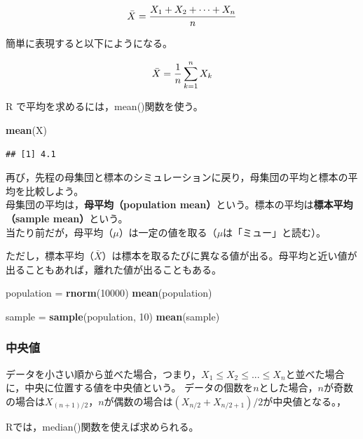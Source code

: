 \documentclass[]{article}
\newenvironment{Shaded}{\begin{snugshade}}{\end{snugshade}}
\newcommand{\KeywordTok}[1]{\textcolor[rgb]{0.13,0.29,0.53}{\textbf{#1}}}
\newcommand{\DecValTok}[1]{\textcolor[rgb]{0.00,0.00,0.81}{#1}}
\newcommand{\StringTok}[1]{\textcolor[rgb]{0.31,0.60,0.02}{#1}}
\newcommand{\NormalTok}[1]{#1}
\begin{document}
\[
\bar{X} = \frac{X_{1} + X_{2} + \cdots + X_{n} }{n}\\  
\]

簡単に表現すると以下にようになる。

\[
\bar{X} = \frac{1}{n}\sum_{k=1}^{n}X_{k}\\  
\]

R で平均を求めるには，mean()関数を使う。

\begin{Shaded}
\begin{Highlighting}[]
\KeywordTok{mean}\NormalTok{(X)}
\end{Highlighting}
\end{Shaded}

\begin{verbatim}
## [1] 4.1
\end{verbatim}

再び，先程の母集団と標本のシミュレーションに戻り，母集団の平均と標本の平均を比較しよう。\\
母集団の平均は，\textbf{母平均（population
mean）}という。標本の平均は\textbf{標本平均（sample mean）}という。\\
当たり前だが，母平均（\(\mu\)）は一定の値を取る（\(\mu\)は「ミュー」と読む）。

ただし，標本平均（\(\bar{X}\)）は標本を取るたびに異なる値が出る。母平均と近い値が出ることもあれば，離れた値が出ることもある。

\begin{Shaded}
\begin{Highlighting}[]
\NormalTok{population =}\StringTok{ }\KeywordTok{rnorm}\NormalTok{(}\DecValTok{10000}\NormalTok{)}
\KeywordTok{mean}\NormalTok{(population)}

\NormalTok{sample =}\StringTok{ }\KeywordTok{sample}\NormalTok{(population, }\DecValTok{10}\NormalTok{)}
\KeywordTok{mean}\NormalTok{(sample)}
\end{Highlighting}
\end{Shaded}

\subsubsection{中央値}

データを小さい順から並べた場合，つまり，\(X_{1} \le X_{2} \le ... \le X_{n}\)と並べた場合に，中央に位置する値を中央値という。
データの個数を\(n\)とした場合，\(n\)が奇数の場合は\(X_{(n+1)/2}\)，\(n\)が偶数の場合は\((X_{n/2}+X_{n/2+1})/2\)が中央値となる。，

Rでは，median()関数を使えば求められる。
\end{document}
